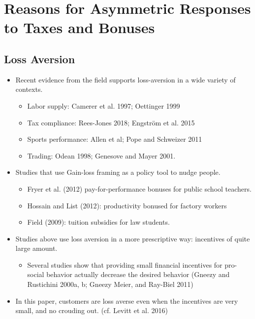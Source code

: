 \documentclass[../root]{subfiles}
\begin{document}
    \section{Reasons for Asymmetric Responses to Taxes and Bonuses}

    \subsection{Loss Aversion}

    \begin{itemize}
      \item Recent evidence from the field supports loss-aversion in a wide variety of contexts.
      \begin{itemize}
        \item Labor supply: Camerer et al. 1997; Oettinger 1999
        \item Tax compliance: Rees-Jones 2018; Engstr\"{o}m et al. 2015
        \item Sports performance: Allen et al; Pope and Schweizer 2011
        \item Trading: Odean 1998; Genesove and Mayer 2001.
      \end{itemize}
      \item Studies that use Gain-loss framing as a policy tool to nudge people.
      \begin{itemize}
        \item Fryer et al. (2012) pay-for-performance bonuses for public school teachers.
        \item Hossain and List (2012): productivity bonused for factory workers
        \item Field (2009): tuition subsidies for law students.
      \end{itemize}
      \item Studies above use loss aversion in a more prescriptive way: incentives of quite large amount.
      \begin{itemize}
        \item Several studies show that providing small financial incentives for pro-social behavior actually decrease the desired behavior (Gneezy and Rustichini 2000a, b; Gneezy Meier, and Ray-Biel 2011)
      \end{itemize}
      \item In this paper, customers are loss averse even when the incentives are very small, and no crouding out. (cf. Levitt et al. 2016)
    \end{itemize}
\end{document}
